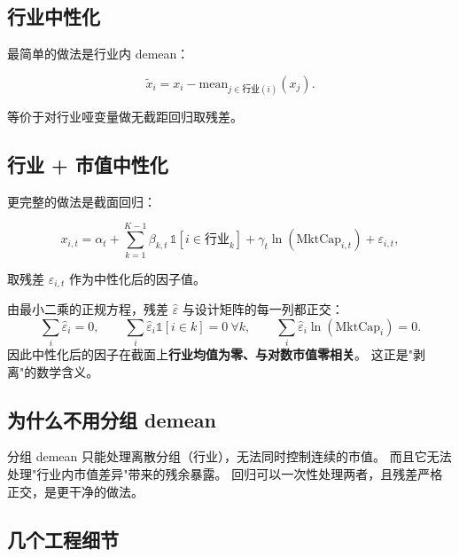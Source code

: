 \subsection{行业中性化}

最简单的做法是行业内 demean：

\begin{equation}
  \tilde x_{i} = x_i - \mathrm{mean}_{j \in \text{行业}(i)}(x_j).
\end{equation}

等价于对行业哑变量做无截距回归取残差。

\subsection{行业 + 市值中性化}

更完整的做法是截面回归：

\begin{equation}
  x_{i,t} = \alpha_t + \sum_{k=1}^{K-1}\beta_{k,t}\,\mathbb{1}[i\in \text{行业}_k]
  + \gamma_t \ln(\text{MktCap}_{i,t}) + \varepsilon_{i,t},
  \label{eq:neutral}
\end{equation}

取残差 $\varepsilon_{i,t}$ 作为中性化后的因子值。

\begin{proposition}[残差的正交性]
由最小二乘的正规方程，残差 $\hat\varepsilon$ 与设计矩阵的每一列都正交：
\begin{equation}
  \sum_i \hat\varepsilon_i = 0, \qquad
  \sum_i \hat\varepsilon_i \mathbb{1}[i\in k] = 0\ \forall k, \qquad
  \sum_i \hat\varepsilon_i \ln(\text{MktCap}_i) = 0.
\end{equation}
因此中性化后的因子在截面上\textbf{行业均值为零、与对数市值零相关}。
这正是"剥离"的数学含义。
\end{proposition}

\subsection{为什么不用分组 demean}

分组 demean 只能处理离散分组（行业），无法同时控制连续的市值。
而且它无法处理"行业内市值差异"带来的残余暴露。
回归可以一次性处理两者，且残差严格正交，是更干净的做法。

\subsection{几个工程细节}

